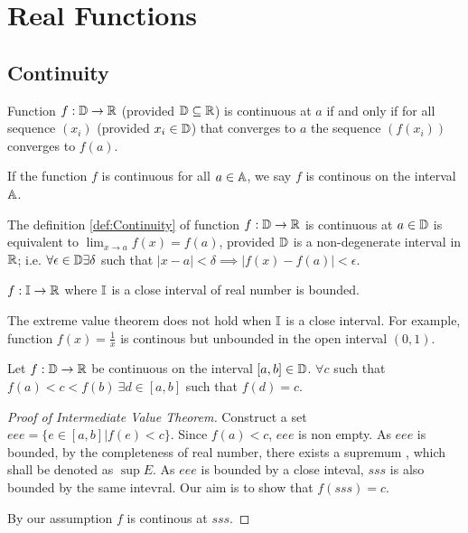 \documentclass[../note.tex]{subfiles}
\begin{document}
\section{Real Functions}

\subsection{Continuity}

\begin{definition}\label{def:Continuity}
	Function $f: \mathbb{D} \rightarrow \mathbb{R}$ (provided $\mathbb{D} \subseteq \mathbb{R}$) is continuous at $a$
	if and only if for all sequence $(x_i)$ (provided $x_i \in \mathbb{D}$) that converges to $a$ the sequence $(f(x_i))$ converges to $f(a)$.

	If the function $f$ is continuous for all $a \in \mathbb{A}$, we say $f$ is continous on the interval $\mathbb{A}$.
\end{definition}

\begin{theorem}
	The definition \ref{def:Continuity} of function $f:\mathbb{D} \rightarrow \mathbb{R}$ is continuous at $a\in \mathbb{D}$ is equivalent to $\lim _{x\to a}f(x) = f(a)$, provided $\mathbb{D}$ is a non-degenerate interval in $\mathbb{R}$; 
	i.e. $\forall \epsilon \in \mathbb{D} \exists \delta $ such that $|x-a| < \delta \implies |f(x)-f(a)| < \epsilon$.
\end{theorem}

\begin{definition}
	$f:\mathbb{I} \rightarrow \mathbb{R}$ where $\mathbb{I}$ is a close interval of real number is bounded.
\end{definition}

\begin{remark}
	The extreme value theorem does not hold when $\mathbb{I}$ is a close interval. For example, function $f(x)=\frac{1}{x}$ is continous but unbounded in the open interval $(0,1)$.
\end{remark}

\begin{theorem}
	Let $f: \mathbb{D} \rightarrow \mathbb{R}$ be continuous on the interval $[a,b]\in \mathbb{D}$. $\forall c $ such that $f(a)<c<f(b)\ \exists d \in [a,b] $ such that $ f(d) = c$.  
\end{theorem}

\begin{proof}[Proof of Intermediate Value Theorem]
	Construct a set $eee = \{e\in [a,b]| f(e)<c\}$. Since $f(a)<c$, $eee$ is non empty.  
	As $eee$ is bounded, by the completeness of real number, there exists a supremum , which shall be denoted as $\sup{E}$. As $eee$ is bounded by a close inteval, $sss$ is also bounded by the same intevral. Our aim is to show that $f(sss)=c$.

	By our assumption $f$ is continous	at $sss$. 
\end{proof}
\end{document}
